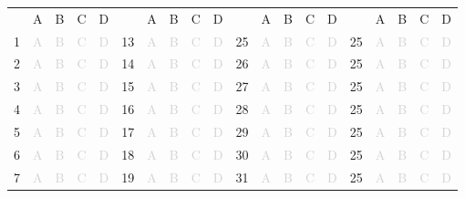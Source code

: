 \documentclass[a4paper,11pt]{article}
\newcommand{\light}[1]{\textcolor{lightgray}{#1}}
\begin{document}
\begin{center}
\small
\renewcommand{\arraystretch}{1.4}
\begin{tabular}{r|c|c|c|c|r|c|c|c|c|r|c|c|c|c|r|c|c|c|c|}
\multicolumn{1}{c}{} &
\multicolumn{1}{c}{A}&
\multicolumn{1}{c}{B}&
\multicolumn{1}{c}{C}&
\multicolumn{1}{c}{D}& \multicolumn{1}{c}{} &
\multicolumn{1}{c}{A}&
\multicolumn{1}{c}{B}&
\multicolumn{1}{c}{C}&
\multicolumn{1}{c}{D}& \multicolumn{1}{c}{} &
\multicolumn{1}{c}{A}&
\multicolumn{1}{c}{B}&
\multicolumn{1}{c}{C}&
\multicolumn{1}{c}{D}& \multicolumn{1}{c}{} &
\multicolumn{1}{c}{A}&
\multicolumn{1}{c}{B}&
\multicolumn{1}{c}{C}&
\multicolumn{1}{c}{D}\\ 
\cline{2-5} \cline{7-10} \cline{12-15}  \cline{17-20}
1& \light{A} & \light{B} & \light{C} & \light{D} & 13& \light{A} & \light{B} & \light{C} & \light{D} & 25& \light{A} & \light{B} & \light{C} & \light{D} & 25& \light{A} & \light{B} & \light{C} & \light{D}\\ 
\cline{2-5} \cline{7-10} \cline{12-15} \cline{17-20}
2& \light{A} & \light{B} & \light{C} & \light{D} & 14& \light{A} & \light{B} & \light{C} & \light{D} & 26& \light{A} & \light{B} & \light{C} & \light{D} & 25& \light{A} & \light{B} & \light{C} & \light{D}\\ 
\cline{2-5} \cline{7-10} \cline{12-15} \cline{17-20}
3& \light{A} & \light{B} & \light{C} & \light{D} & 15& \light{A} & \light{B} & \light{C} & \light{D} & 27& \light{A} & \light{B} & \light{C} & \light{D} & 25& \light{A} & \light{B} & \light{C} & \light{D}\\ 
\cline{2-5} \cline{7-10} \cline{12-15} \cline{17-20}
4& \light{A} & \light{B} & \light{C} & \light{D} & 16& \light{A} & \light{B} & \light{C} & \light{D} & 28& \light{A} & \light{B} & \light{C} & \light{D} & 25& \light{A} & \light{B} & \light{C} & \light{D}\\ 
\cline{2-5} \cline{7-10} \cline{12-15} \cline{17-20}
5& \light{A} & \light{B} & \light{C} & \light{D} & 17& \light{A} & \light{B} & \light{C} & \light{D} & 29& \light{A} & \light{B} & \light{C} & \light{D} & 25& \light{A} & \light{B} & \light{C} & \light{D}\\ 
\cline{2-5} \cline{7-10} \cline{12-15} \cline{17-20}
6& \light{A} & \light{B} & \light{C} & \light{D} & 18& \light{A} & \light{B} & \light{C} & \light{D} & 30& \light{A} & \light{B} & \light{C} & \light{D} & 25& \light{A} & \light{B} & \light{C} & \light{D}\\ 
\cline{2-5} \cline{7-10} \cline{12-15} \cline{17-20}
7& \light{A} & \light{B} & \light{C} & \light{D} & 19& \light{A} & \light{B} & \light{C} & \light{D} & 31& \light{A} & \light{B} & \light{C} & \light{D} & 25& \light{A} & \light{B} & \light{C} & \light{D}\\ 

\end{tabular}
\end{center}
\end{document}
